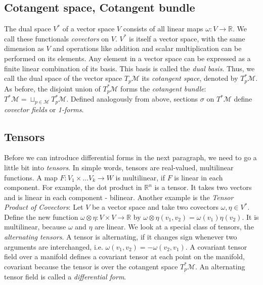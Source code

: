 \documentclass[../thesis.tex]{subfiles}
\begin{document}
\subsection{Cotangent space, Cotangent bundle} The dual space $V^*$ of a vector space $V$
consists of all linear maps $\omega: V \to \mathbb{R}$. We call these functionals \emph{covectors} on $V$.
$V^*$ is itself a vector space, with the same dimension as $V$ and operations like addition and scalar multiplication
can be performed on its elements. Any element in a vector space can be expressed as 
a finite linear combination of its basis. This basis is called the \emph{dual basis}.
Thus, we call the dual space of the vector space $T_p\mathcal{M}$ its \emph{cotangent space},
denoted by $T^*_p\mathcal{M}$. As before, the disjoint union of $T^*_p\mathcal{M}$ forms the \emph{cotangent bundle}:
$T^*\mathcal{M}=\sqcup _{p\in \mathcal{M}}T^*_p\mathcal{M}$. Defined analogously from above,
sections $\sigma$ on $T^*\mathcal{M}$ define \emph{covector fields} or \emph{1-forms}.

\subsection{Tensors}
Before we can introduce differential forms in the next paragraph, we need to go a little bit into \emph{tensors}.
In simple words, tensors are real-valued, multilinear functions.
A map $F: V_1 \times \dots V_k \to W$ is multilinear, if $F$ is linear in each component.
For example, the dot product in $\mathbb{R}^n$ is a tensor. It takes two vectors and is linear in each component - bilinear.
Another example is the \emph{Tensor Product of Covectors}:
Let $V$ be a vector space and take two covectors $\omega, \eta \in V^*$.
Define the new function $\omega \otimes \eta: V\times V \to \mathbb{R}$ by
$\omega \otimes \eta (v_1,v_2) = \omega(v_1)\eta(v_2)$. It is multilinear, because $\omega$ and $\eta$ are linear.
We look at a special class of tensors, the \emph{alternating tensors}.
A tensor is alternating, if it changes sign whenever two arguments are interchanged,
i.e. $\omega(v_1, v_2) = -\omega(v_2, v_1)$.
A covariant tensor field over a manifold defines a covariant tensor at each point on the manifold,
covariant because the tensor is over the cotangent space $T^*_p\mathcal{M}$.
An alternating tensor field is called a \emph{differential form}.
\end{document}
